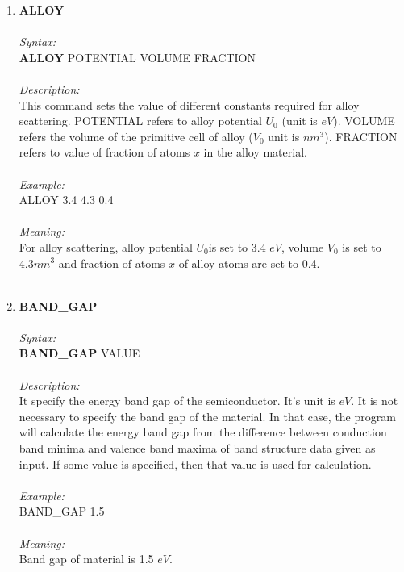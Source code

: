 \documentclass[12pt]{article}
\begin{document}
\begin{enumerate}
    \item \textbf{ALLOY} \\ \\
    \textit{Syntax:} \\
    \textbf{ALLOY} POTENTIAL VOLUME FRACTION \\ \\
    \textit{Description:} \\
    This command sets the value of different constants required for alloy scattering. POTENTIAL refers to alloy potential $U_0$ (unit is $eV$). VOLUME refers the volume of the primitive cell of alloy ($V_0$ unit is $nm^3$). FRACTION refers to value of fraction of atoms $x$ in the alloy material. \\ \\
    \textit{Example:} \\ 
    ALLOY 3.4 4.3 0.4 \\ \\
    \textit{Meaning:} \\    
    For alloy scattering, alloy potential $U_0$is set to 3.4 $eV$, volume $V_0$ is set to $4.3 nm^3$ and fraction of atoms $x$ of alloy atoms are set to 0.4. \\ \\
  
    \item \textbf{BAND\_GAP} \\ \\
    \textit{Syntax:} \\
    \textbf{BAND\_GAP} VALUE \\ \\
    \textit{Description:} \\
    It specify the energy band gap of the semiconductor. It’s unit is $eV$. It is not necessary to specify the band gap of the material. In that case, the program will calculate the energy band gap from the difference between conduction band minima and valence band maxima of band structure data given as input. If some value is specified, then that value is used for calculation. \\ \\
    \textit{Example:} \\
    BAND\_GAP 1.5 \\ \\
    \textit{Meaning:} \\  
    Band gap of material is 1.5 $eV$. \\ \\


\end{enumerate}
\end{document}

